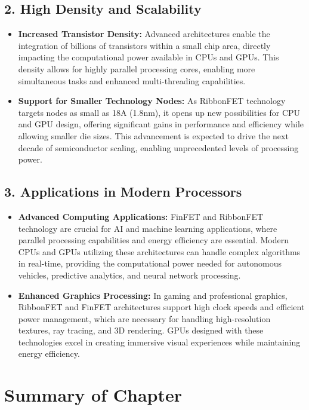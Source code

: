 \documentclass[12pt]{report}
\begin{document}
\begin{titlepage}
\subsection*{2. High Density and Scalability}
\begin{itemize}
    \item \textbf{Increased Transistor Density:} Advanced architectures enable the integration of billions of transistors within a small chip area, directly impacting the computational power available in CPUs and GPUs. This density allows for highly parallel processing cores, enabling more simultaneous tasks and enhanced multi-threading capabilities.
    \item \textbf{Support for Smaller Technology Nodes:} As RibbonFET technology targets nodes as small as 18A (1.8nm), it opens up new possibilities for CPU and GPU design, offering significant gains in performance and efficiency while allowing smaller die sizes. This advancement is expected to drive the next decade of semiconductor scaling, enabling unprecedented levels of processing power.
\end{itemize}

\subsection*{3. Applications in Modern Processors}
\begin{itemize}
    \item \textbf{Advanced Computing Applications:} FinFET and RibbonFET technology are crucial for AI and machine learning applications, where parallel processing capabilities and energy efficiency are essential. Modern CPUs and GPUs utilizing these architectures can handle complex algorithms in real-time, providing the computational power needed for autonomous vehicles, predictive analytics, and neural network processing.
    \item \textbf{Enhanced Graphics Processing:} In gaming and professional graphics, RibbonFET and FinFET architectures support high clock speeds and efficient power management, which are necessary for handling high-resolution textures, ray tracing, and 3D rendering. GPUs designed with these technologies excel in creating immersive visual experiences while maintaining energy efficiency.
\end{itemize}

\section{Summary of Chapter}


\end{titlepage}
\end{document}
